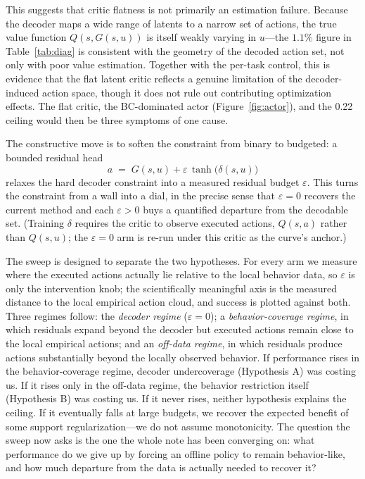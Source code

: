 \documentclass{article}
\begin{document}
This suggests that critic flatness is not primarily an estimation failure. Because the decoder maps a wide range of latents to a narrow set of actions, the true value function $Q(s,G(s,u))$ is itself weakly varying in $u$---the $1.1\%$ figure in Table~\ref{tab:diag} is consistent with the geometry of the decoded action set, not only with poor value estimation. Together with the per-task control, this is evidence that the flat latent critic reflects a genuine limitation of the decoder-induced action space, though it does not rule out contributing optimization effects. The flat critic, the BC-dominated actor (Figure~\ref{fig:actor}), and the 0.22 ceiling would then be three symptoms of one cause.

The constructive move is to soften the constraint from binary to budgeted: a bounded residual head
\begin{equation*}
a \;=\; G(s,u) + \varepsilon\,\tanh\!\big(\delta(s,u)\big)
\end{equation*}
relaxes the hard decoder constraint into a measured residual budget $\varepsilon$. This turns the constraint from a wall into a dial, in the precise sense that $\varepsilon=0$ recovers the current method and each $\varepsilon>0$ buys a quantified departure from the decodable set. (Training $\delta$ requires the critic to observe executed actions, $Q(s,a)$ rather than $Q(s,u)$; the $\varepsilon=0$ arm is re-run under this critic as the curve's anchor.)

The sweep is designed to separate the two hypotheses. For every arm we measure where the executed actions actually lie relative to the local behavior data, so $\varepsilon$ is only the intervention knob; the scientifically meaningful axis is the measured distance to the local empirical action cloud, and success is plotted against both. Three regimes follow: the \emph{decoder regime} ($\varepsilon=0$); a \emph{behavior-coverage regime}, in which residuals expand beyond the decoder but executed actions remain close to the local empirical actions; and an \emph{off-data regime}, in which residuals produce actions substantially beyond the locally observed behavior. If performance rises in the behavior-coverage regime, decoder undercoverage (Hypothesis A) was costing us. If it rises only in the off-data regime, the behavior restriction itself (Hypothesis B) was costing us. If it never rises, neither hypothesis explains the ceiling. If it eventually falls at large budgets, we recover the expected benefit of some support regularization---we do not assume monotonicity. The question the sweep now asks is the one the whole note has been converging on: what performance do we give up by forcing an offline policy to remain behavior-like, and how much departure from the data is actually needed to recover it?
\end{document}
